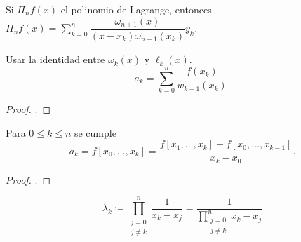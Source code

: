 \begin{frame}
	\begin{theorem}
		Si $\Pi_{n}f\left(x\right)$ el polinomio de Lagrange, entonces
		\begin{math}
			\Pi_{n}f\left(x\right)=
			\sum\limits_{k=0}^{n}
			\dfrac{
				\omega_{n+1}\left(x\right)
			}{
				\left(x-x_{k}\right)\omega^{\prime}_{n+1}\left(x_{k}\right)
			}
			y_{k}
		\end{math}.
	\end{theorem}

	\begin{theorem}
		Usar la identidad entre $\omega_{k}\left(x\right)$ y $\ell_{k}\left(x\right)$.
		\begin{equation*}
			a_{k}=
			\sum\limits_{k=0}^{n}
			\dfrac{
				f\left(x_{k}\right)
			}{
				w^{\prime}_{k+1}
				\left(x_{k}\right)
			}.
		\end{equation*}
	\end{theorem}

	\begin{proof}
		.
	\end{proof}
\end{frame}

\begin{frame}
	\begin{theorem}
		Para $0\leq k\leq n$ se cumple
		\begin{equation*}
			a_{k}=
			f\left[x_{0},\ldots,x_{k}\right]=
			\dfrac{
			f\left[x_{1},\ldots,x_{k}\right]-
			f\left[x_{0},\ldots,x_{k-1}\right]
			}{x_{k}-x_{0}}.
		\end{equation*}
	\end{theorem}

	\begin{proof}
		.
	\end{proof}

	\begin{theorem} %
		\begin{equation*}
			\lambda_{k}\coloneqq
			\prod\limits_{\substack{j=0               \\j\neq k}}^{n}
			\dfrac{1}{x_{k}-x_{j}}=
			\dfrac{1}{\prod\limits_{\substack{j=0               \\j\neq k}}^{n}x_{k}-x_{j}}
		\end{equation*}
	\end{theorem}
\end{frame}

